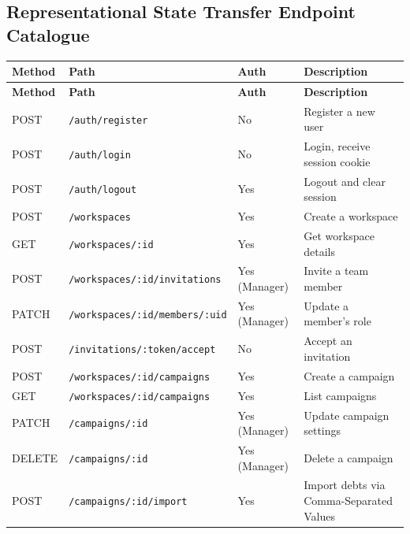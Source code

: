 \documentclass[12pt,a4paper]{report}
\begin{document}
\subsection{Representational State Transfer Endpoint Catalogue}

{\footnotesize
\setlength{\tabcolsep}{4pt}%
\begin{longtable}{|p{1.2cm}|p{4.95cm}|p{2.25cm}|p{5.05cm}|}
  \hline
  \rowcolor{accentblue!10}
  \textbf{Method} & \textbf{Path} & \textbf{Auth} & \textbf{Description} \\
  \hline
  \endfirsthead
  \hline
  \rowcolor{accentblue!10}
  \textbf{Method} & \textbf{Path} & \textbf{Auth} & \textbf{Description} \\
  \hline
  \endhead
  POST  & \texttt{/auth/register}                    & No             & Register a new user \\
  \hline
  POST  & \texttt{/auth/login}                       & No             & Login, receive session cookie \\
  \hline
  POST  & \texttt{/auth/logout}                      & Yes            & Logout and clear session \\
  \hline
  POST  & \texttt{/workspaces}                       & Yes            & Create a workspace \\
  \hline
  GET   & \texttt{/workspaces/:id}                   & Yes            & Get workspace details \\
  \hline
  POST  & \texttt{/workspaces/:id/invitations}       & Yes (Manager)  & Invite a team member \\
  \hline
  PATCH & \texttt{/workspaces/:id/members/:uid}      & Yes (Manager)  & Update a member's role \\
  \hline
  POST  & \texttt{/invitations/:token/accept}        & No             & Accept an invitation \\
  \hline
  POST  & \texttt{/workspaces/:id/campaigns}         & Yes            & Create a campaign \\
  \hline
  GET   & \texttt{/workspaces/:id/campaigns}         & Yes            & List campaigns \\
  \hline
  PATCH & \texttt{/campaigns/:id}                    & Yes (Manager)  & Update campaign settings \\
  \hline
  DELETE & \texttt{/campaigns/:id}                   & Yes (Manager)  & Delete a campaign \\
  \hline
  POST  & \texttt{/campaigns/:id/import}             & Yes            & Import debts via Comma-Separated Values \\

\end{longtable}}
\end{document}
